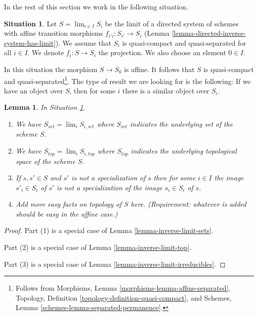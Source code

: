 \documentclass{stacks-project}
\theoremstyle{plain}
\newtheorem{lemma}[subsection]{Lemma}
\theoremstyle{definition}
\newtheorem{situation}[subsection]{Situation}
\theoremstyle{remark}
\numberwithin{equation}{subsection}
\def\lim{\mathop{\mathrm{lim}}\nolimits}
\begin{document}
\noindent
In the rest of this section we work in the following situation.

\begin{situation}
\label{situation-descent}
Let $S = \lim_{i \in I} S_i$ be the limit of a directed system of schemes
with affine transition morphisms $f_{i'i} : S_{i'} \to S_i$
(Lemma \ref{lemma-directed-inverse-system-has-limit}).
We assume that $S_i$ is quasi-compact and quasi-separated for all $i \in I$.
We denote $f_i : S \to S_i$ the projection.
We also choose an element $0 \in I$.
\end{situation}

\noindent
In this situation the morphism $S \to S_0$ is affine. It follows
that $S$ is quasi-compact and quasi-separated\footnote{Follows
from Morphisms, Lemma \ref{morphisms-lemma-affine-separated},
Topology, Definition \ref{topology-definition-quasi-compact}, and
Schemes, Lemma \ref{schemes-lemma-separated-permanence}.}.
The type of result we are looking for is the following:
If we have an object over $S$, then for some $i$ there is a
similar object over $S_i$.

\begin{lemma}
\label{lemma-topology-limit}
In Situation \ref{situation-descent}.
\begin{enumerate}
\item We have $S_{set} = \lim_i S_{i, set}$ where $S_{set}$
indicates the underlying set of the scheme $S$.
\item We have $S_{top} = \lim_i S_{i, top}$ where $S_{top}$
indicates the underlying topological space of the scheme $S$.
\item If $s, s' \in S$ and $s'$ is not a specialization of $s$
then for some $i \in I$ the image $s'_i \in S_i$ of $s'$ is not
a specialization of the image $s_i \in S_i$ of $s$.
\item Add more easy facts on topology of $S$ here.
(Requirement: whatever is added should be easy in the affine case.)
\end{enumerate}
\end{lemma}

\begin{proof}
Part (1) is a special case of Lemma \ref{lemma-inverse-limit-sets}.

\medskip\noindent
Part (2) is a special case of Lemma \ref{lemma-inverse-limit-top}.

\medskip\noindent
Part (3) is a special case of Lemma \ref{lemma-inverse-limit-irreducibles}.
\end{proof}
\end{document}
